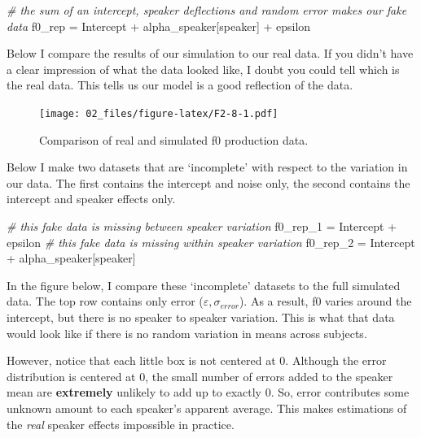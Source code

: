 \documentclass[
]{book}
\newenvironment{Shaded}{\begin{snugshade}}{\end{snugshade}}
\newcommand{\CommentTok}[1]{\textcolor[rgb]{0.56,0.35,0.01}{\textit{#1}}}
\newcommand{\NormalTok}[1]{#1}
\newcommand{\OtherTok}[1]{\textcolor[rgb]{0.56,0.35,0.01}{#1}}
\newcommand{\SpecialCharTok}[1]{\textcolor[rgb]{0.00,0.00,0.00}{#1}}
\begin{document}
\begin{Shaded}
\begin{Highlighting}[]
\CommentTok{\# the sum of an intercept, speaker deflections and random error makes our fake data}
\NormalTok{f0\_rep }\OtherTok{=}\NormalTok{ Intercept }\SpecialCharTok{+}\NormalTok{ alpha\_speaker[speaker] }\SpecialCharTok{+}\NormalTok{ epsilon}
\end{Highlighting}
\end{Shaded}

Below I compare the results of our simulation to our real data. If you didn't have a clear impression of what the data looked like, I doubt you could tell which is the real data. This tells us our model is a good reflection of the data.

\begin{figure}
\centering
\texttt{[image: 02\_files/figure-latex/F2-8-1.pdf]}
\caption{\label{fig:F2-8}Comparison of real and simulated f0 production data.}
\end{figure}

Below I make two datasets that are `incomplete' with respect to the variation in our data. The first contains the intercept and noise only, the second contains the intercept and speaker effects only.

\begin{Shaded}
\begin{Highlighting}[]
\CommentTok{\# this fake data is missing between speaker variation}
\NormalTok{f0\_rep\_1 }\OtherTok{=}\NormalTok{ Intercept }\SpecialCharTok{+}\NormalTok{ epsilon}
\CommentTok{\# this fake data is missing within speaker variation}
\NormalTok{f0\_rep\_2 }\OtherTok{=}\NormalTok{ Intercept }\SpecialCharTok{+}\NormalTok{ alpha\_speaker[speaker]}
\end{Highlighting}
\end{Shaded}

In the figure below, I compare these `incomplete' datasets to the full simulated data. The top row contains only error (\(\varepsilon, \sigma_{error}\)). As a result, f0 varies around the intercept, but there is no speaker to speaker variation. This is what that data would look like if there is no random variation in means across subjects.

However, notice that each little box is not centered at 0. Although the error distribution is centered at 0, the small number of errors added to the speaker mean are \textbf{extremely} unlikely to add up to exactly 0. So, error contributes some unknown amount to each speaker's apparent average. This makes estimations of the \emph{real} speaker effects impossible in practice.
\end{document}
